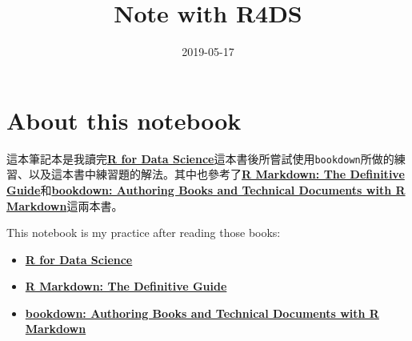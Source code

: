 \documentclass[]{book}
\title{Note with R4DS}
\author{}
\date{2019-05-17}
\providecommand{\tightlist}{%
  \setlength{\itemsep}{0pt}\setlength{\parskip}{0pt}}
\begin{document}
\maketitle

{
\setcounter{tocdepth}{1}
\tableofcontents
}
\hypertarget{about-this-notebook}{%
\chapter*{About this notebook}\label{about-this-notebook}}

這本筆記本是我讀完\href{https://r4ds.had.co.nz}{\textbf{R for Data Science}}這本書後所嘗試使用\texttt{bookdown}所做的練習、以及這本書中練習題的解法。其中也參考了\href{https://bookdown.org/yihui/rmarkdown/}{\textbf{R Markdown: The Definitive Guide}}和\href{https://bookdown.org/yihui/bookdown/}{\textbf{bookdown: Authoring Books and Technical Documents with R Markdown}}這兩本書。

This notebook is my practice after reading those books:

\begin{itemize}
\tightlist
\item
  \href{https://r4ds.had.co.nz}{\textbf{R for Data Science}}
\item
  \href{https://bookdown.org/yihui/rmarkdown/}{\textbf{R Markdown: The Definitive Guide}}
\item
  \href{https://bookdown.org/yihui/bookdown/}{\textbf{bookdown: Authoring Books and Technical Documents with R Markdown}}
\end{itemize}
\end{document}
